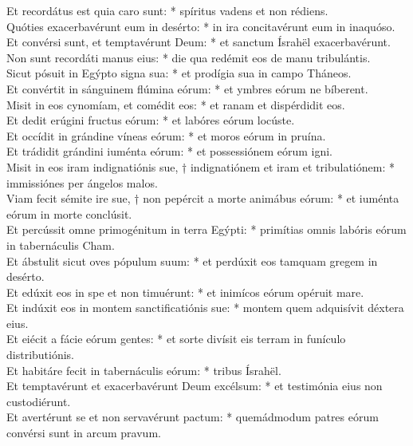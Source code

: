 {	Et recordátus est quia caro sunt: * spíritus vadens et non rédiens. \\
	Quóties exacerbavérunt eum in desérto: * in ira concitavérunt eum in inaquóso. \\
	Et convérsi sunt, et temptavérunt Deum: * et sanctum Ísrahël exacerbavérunt. \\
	Non sunt recordáti manus eius: * die qua redémit eos de manu tribulántis. \\
	Sicut pósuit in Egýpto signa sua: * et prodígia sua in campo Tháneos. \\
	Et convértit in sánguinem flúmina eórum: * et ymbres eórum ne bíberent. \\
	Misit in eos cynomíam, et comédit eos: * et ranam et dispérdidit eos. \\
	Et dedit erúgini fructus eórum: * et labóres eórum locúste. \\
	Et occídit in grándine víneas eórum: * et moros eórum in pruína. \\
	Et trádidit grándini iuménta eórum: * et possessiónem eórum igni. \\
	Misit in eos iram indignatiónis sue, † indignatiónem et iram et tribulatiónem: * immissiónes per ángelos malos. \\
	Viam fecit sémite ire sue, † non pepércit a morte animábus eórum: * et iuménta eórum in morte conclúsit. \\
	Et percússit omne primogénitum in terra Egýpti: * primítias omnis labóris eórum in tabernáculis Cham. \\
	Et ábstulit sicut oves pópulum suum: * et perdúxit eos tamquam gregem in desérto. \\
	Et edúxit eos in spe et non timuérunt: * et inimícos eórum opéruit mare. \\
	Et indúxit eos in montem sanctificatiónis sue: * montem quem adquisívit déxtera eius. \\
	Et eiécit a fácie eórum gentes: * et sorte divísit eis terram in funículo distributiónis. \\
	Et habitáre fecit in tabernáculis eórum: * tribus Ísrahël. \\
	Et temptavérunt et exacerbavérunt Deum excélsum: * et testimónia eius non custodiérunt. \\
	Et avertérunt se et non servavérunt pactum: * quemádmodum patres eórum convérsi sunt in arcum pravum. \\
}
